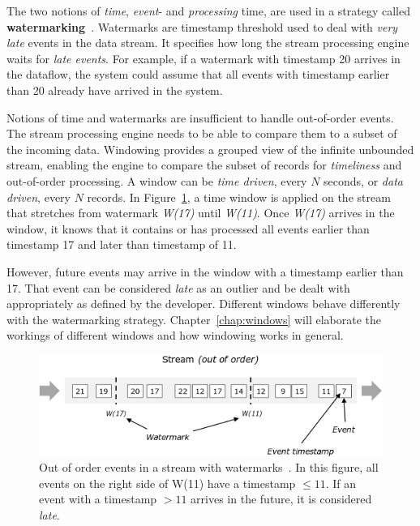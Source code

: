 The two notions of \emph{time}, \emph{event}- and \emph{processing} time,
are used in a strategy called \textbf{watermarking}~\cite{watermark_millwheel}. 
Watermarks are timestamp threshold used to deal with \emph{very late} events 
in the data stream. It specifies how long the stream processing engine 
waits for \emph{late events}. For example, if a watermark with timestamp 
20 arrives in the dataflow, the system could assume that all events 
with timestamp earlier than 20 already have arrived in the system. 

Notions of time and watermarks are insufficient to handle out-of-order 
events. The stream processing engine needs to be able to compare them to a subset of the 
incoming data. Windowing provides a grouped view of the infinite unbounded stream, 
enabling the engine to compare the subset of records for \emph{timeliness} and out-of-order 
processing. A window can be \emph{time driven}, every $N$ seconds, or \emph{data driven}, 
every $N$ records. 
In Figure~\ref{fig:watermark}, a time window is applied on the stream that
stretches from watermark \emph{W(17)} until \emph{W(11)}. 
Once \emph{W(17)} arrives in the window, it knows that it contains or has 
processed all events earlier than timestamp 17 and later than timestamp of 11.  

However, future events may arrive in the window 
with a timestamp earlier than 17. That event can be considered \emph{late} as an outlier and 
be dealt with appropriately as defined by the developer. Different windows 
behave differently with the watermarking strategy. Chapter~\ref{chap:windows}
will elaborate the workings of different windows and how windowing works in 
general. 


\begin{figure}[htpb]
    \centering
    \includegraphics[width=0.8\linewidth]{fig/stream_watermark_out_of_order.png}
    \caption{Out of order events in a stream with watermarks~\cite{watermark_flink}. In this figure, 
    all events on the right side of W(11) have a timestamp $\le 11$. If an event with 
    a timestamp $> 11$ arrives in the future, it is considered \emph{late}.}
    \label{fig:watermark}
\end{figure}


